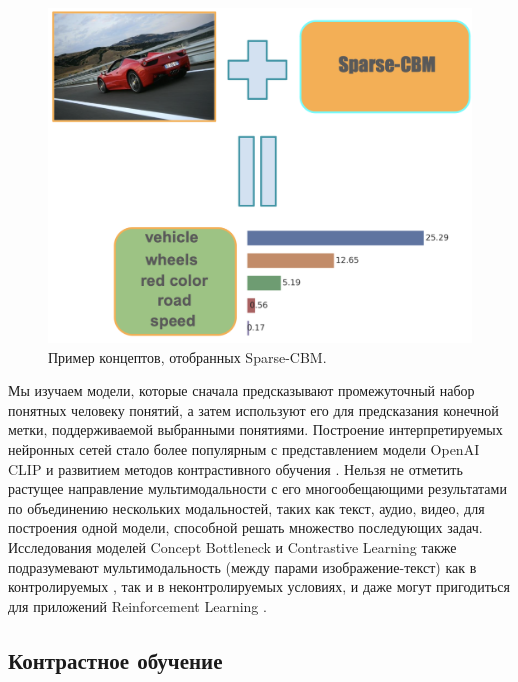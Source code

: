 \begin{figure}[t]
\begin{center}
\centerline{
\includegraphics[width=0.55\columnwidth]{./figures/opening_test_3.png}}
\caption{Пример концептов, отобранных Sparse-CBM.}
\label{fig:opening}
\end{center}
\vskip -0.4in
\end{figure}
Мы изучаем модели, которые сначала предсказывают промежуточный набор понятных человеку понятий, а затем используют его для предсказания конечной метки, поддерживаемой выбранными понятиями. Построение интерпретируемых нейронных сетей стало более популярным с представлением модели OpenAI CLIP \cite{radford2021learning} и развитием методов контрастивного обучения \cite{aljundi2022contrastive}. Нельзя не отметить растущее направление мультимодальности \cite{reed2022generalist,chen2023sharegpt4v} с его многообещающими результатами по объединению нескольких модальностей, таких как текст, аудио, видео, для построения одной модели, способной решать множество последующих задач. Исследования моделей Concept Bottleneck и Contrastive Learning также подразумевают мультимодальность (между парами изображение-текст) как в контролируемых \cite{khosla2021supervised}, так и в неконтролируемых \cite{gao2022simcse} условиях, и даже могут пригодиться для приложений Reinforcement Learning \cite{srinivas2020curl}.

\subsection{Контрастное обучение}

